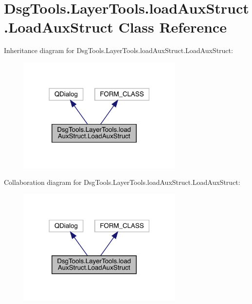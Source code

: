 \hypertarget{class_dsg_tools_1_1_layer_tools_1_1load_aux_struct_1_1_load_aux_struct}{}\section{Dsg\+Tools.\+Layer\+Tools.\+load\+Aux\+Struct.\+Load\+Aux\+Struct Class Reference}
\label{class_dsg_tools_1_1_layer_tools_1_1load_aux_struct_1_1_load_aux_struct}


Inheritance diagram for Dsg\+Tools.\+Layer\+Tools.\+load\+Aux\+Struct.\+Load\+Aux\+Struct\+:
\nopagebreak
\begin{figure}[H]
\begin{center}
\leavevmode
\includegraphics[width=234pt]{class_dsg_tools_1_1_layer_tools_1_1load_aux_struct_1_1_load_aux_struct__inherit__graph}
\end{center}
\end{figure}


Collaboration diagram for Dsg\+Tools.\+Layer\+Tools.\+load\+Aux\+Struct.\+Load\+Aux\+Struct\+:
\nopagebreak
\begin{figure}[H]
\begin{center}
\leavevmode
\includegraphics[width=234pt]{class_dsg_tools_1_1_layer_tools_1_1load_aux_struct_1_1_load_aux_struct__coll__graph}
\end{center}
\end{figure}
